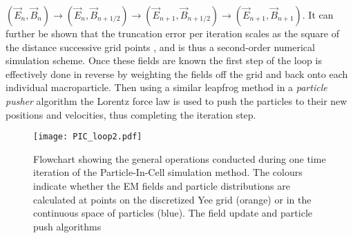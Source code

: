 $\left(\vec{E}_n,\vec{B}_n\right) \to (\vec{E}_n,\vec{B}_{n+1/2}) \to (\vec{E}_{n+1},\vec{B}_{n+1/2})  \to  (\vec{E}_{n+1},\vec{B}_{n+1})$. It can further be shown that the truncation error per iteration scales as the square of the distance successive grid points \cite{Lawrence-Douglas2013}, and is thus a second-order numerical simulation scheme. Once these fields are known the first step of the loop is effectively done in reverse by weighting the fields off the grid and back onto each individual macroparticle. Then using a similar leapfrog method in a \textit{particle pusher} algorithm the Lorentz force law is used to push the particles to their new positions and velocities, thus completing the iteration step. 
\begin{figure}
\centering
\texttt{[image: PIC\_loop2.pdf]}\vspace{-30pt}
\caption{\small{Flowchart showing the general operations conducted during one time iteration of the Particle-In-Cell simulation method. The colours indicate whether the EM fields and particle distributions are calculated at points on the discretized Yee grid (orange) or in the continuous space of particles (blue). The field update and particle push algorithms}}
\label{PIC_loop}
\end{figure}


